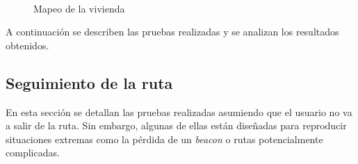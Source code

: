 \begin{figure}[t!]
	\centering
	
	
	\\
	
	\caption{Mapeo de la vivienda}
	\label{fig:mapeoCasa}
\end{figure}

A continuación se describen las pruebas realizadas y se analizan los resultados obtenidos.

\subsection{Seguimiento de la ruta}
En esta sección se detallan las pruebas realizadas asumiendo que el usuario no va a salir de la ruta. Sin embargo, algunas de ellas están diseñadas para reproducir situaciones extremas como la pérdida de un \textit{beacon} o rutas potencialmente complicadas.


